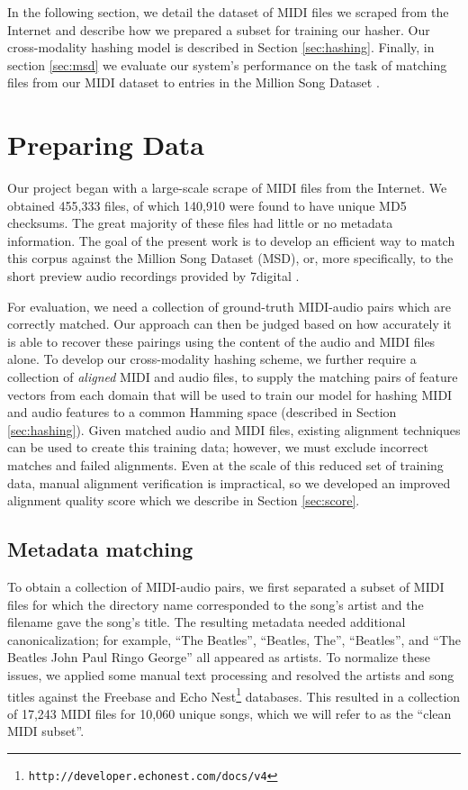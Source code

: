 \documentclass{article}
\begin{document}
In the following section, we detail the dataset of MIDI files we scraped from the Internet and describe how we prepared a subset for training our hasher.
Our cross-modality hashing model is described in Section \ref{sec:hashing}.
Finally, in section \ref{sec:msd} we evaluate our system's performance on the task of matching files from our MIDI dataset to entries in the Million Song Dataset \cite{bertin2011million}.

\section{Preparing Data}
\label{sec:dataset}

Our project began with a large-scale scrape of MIDI files from the Internet.
We obtained 455,333 files, of which 140,910 were found to have unique MD5 checksums.
The great majority of these files had little or no metadata information.
The goal of the present work is to develop an efficient way to match this corpus against the Million Song Dataset (MSD), or, more specifically, to the short preview audio recordings provided by 7digital \cite{schindler2012facilitating}.

For evaluation, we need a collection of ground-truth MIDI-audio pairs which are correctly matched.
Our approach can then be judged based on how accurately it is able to recover these pairings using the content of the audio and MIDI files alone.
To develop our cross-modality hashing scheme, we further require a collection of {\em aligned} MIDI and audio files, to supply the matching pairs of feature vectors from each domain that will be used to train our model for hashing MIDI and audio features to a common Hamming space (described in Section \ref{sec:hashing}).
Given matched audio and MIDI files, existing alignment techniques can be used to create this training data; however, we must exclude incorrect matches and failed alignments.
Even at the scale of this reduced set of training data, manual alignment verification is impractical, so we developed an improved alignment quality score which we describe in Section \ref{sec:score}.

\subsection{Metadata matching}

To obtain a collection of MIDI-audio pairs, we first separated a subset of MIDI files for which the directory name corresponded to the song's artist and the filename gave the song's title.
The resulting metadata needed additional canonicalization; for example, ``The Beatles'', ``Beatles, The'', ``Beatles'', and ``The Beatles John Paul Ringo George'' all appeared as artists.
To normalize these issues, we applied some manual text processing and resolved the artists and song titles against the Freebase \cite{bollacker2008freebase} and Echo Nest\footnote{\texttt{http://developer.echonest.com/docs/v4}} databases.
This resulted in a collection of 17,243 MIDI files for 10,060 unique songs, which we will refer to as the ``clean MIDI subset''.
\end{document}
